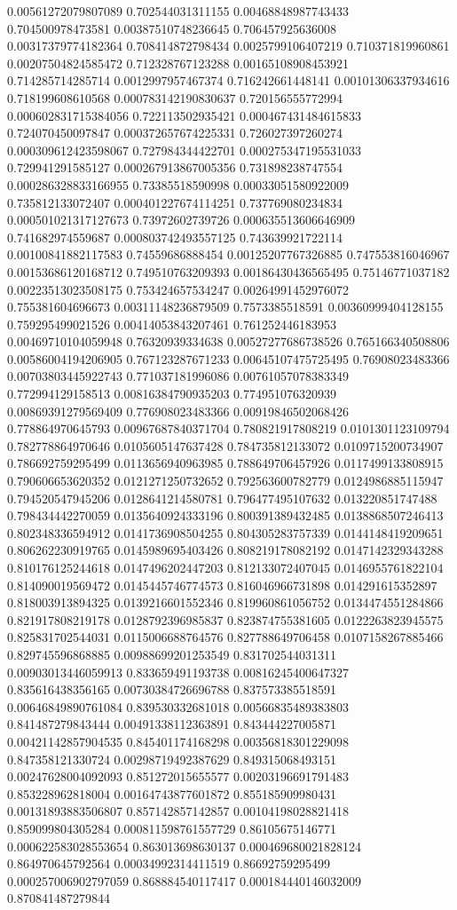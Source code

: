 \begin{table}
\begin{tabu}
\begin{sparkline}{10}
0.00561272079807089 0.702544031311155 0.00468848987743433 0.704500978473581 0.00387510748236645 0.706457925636008 0.00317379774182364 0.708414872798434 0.0025799106407219 0.710371819960861 0.00207504824585472 0.712328767123288 0.00165108908453921 0.714285714285714 0.0012997957467374 0.716242661448141 0.00101306337934616 0.718199608610568 0.000783142190830637 0.720156555772994 0.000602831715384056 0.722113502935421 0.000467431484615833 0.724070450097847 0.000372657674225331 0.726027397260274 0.000309612423598067 0.727984344422701 0.000275347195531033 0.729941291585127 0.000267913867005356 0.731898238747554 0.000286328833166955 0.73385518590998 0.00033051580922009 0.735812133072407 0.000401227674114251 0.737769080234834 0.000501021317127673 0.73972602739726 0.000635513606646909 0.741682974559687 0.000803742493557125 0.743639921722114 0.00100841882117583 0.74559686888454 0.00125207767326885 0.747553816046967 0.00153686120168712 0.749510763209393 0.00186430436565495 0.75146771037182 0.00223513023508175 0.753424657534247 0.00264991452976072 0.755381604696673 0.00311148236879509 0.7573385518591 0.00360999404128155 0.759295499021526 0.00414053843207461 0.761252446183953 0.00469710104059948 0.76320939334638 0.00527277686738526 0.765166340508806 0.00586004194206905 0.767123287671233 0.00645107475725495 0.76908023483366 0.00703803445922743 0.771037181996086 0.00761057078383349 0.772994129158513 0.00816384790935203 0.774951076320939 0.00869391279569409 0.776908023483366 0.00919846502068426 0.778864970645793 0.00967687840371704 0.780821917808219 0.0101301123109794 0.782778864970646 0.0105605147637428 0.784735812133072 0.0109715200734907 0.786692759295499 0.0113656940963985 0.788649706457926 0.0117499133808915 0.790606653620352 0.0121271250732652 0.792563600782779 0.0124986885115947 0.794520547945206 0.0128641214580781 0.796477495107632 0.013220851747488 0.798434442270059 0.0135640924333196 0.800391389432485 0.0138868507246413 0.802348336594912 0.0141736908504255 0.804305283757339 0.0144148419209651 0.806262230919765 0.0145989695403426 0.808219178082192 0.0147142329343288 0.810176125244618 0.0147496202447203 0.812133072407045 0.0146955761822104 0.814090019569472 0.0145445746774573 0.816046966731898 0.014291615352897 0.818003913894325 0.0139216601552346 0.819960861056752 0.0134474551284866 0.821917808219178 0.0128792396985837 0.823874755381605 0.0122263823945575 0.825831702544031 0.0115006688764576 0.827788649706458 0.0107158267885466 0.829745596868885 0.00988699201253549 0.831702544031311 0.00903013446059913 0.833659491193738 0.00816245400647327 0.835616438356165 0.00730384726696788 0.837573385518591 0.00646849890761084 0.839530332681018 0.00566835489383803 0.841487279843444 0.00491338112363891 0.843444227005871 0.00421142857904535 0.845401174168298 0.00356818301229098 0.847358121330724 0.00298719492387629 0.849315068493151 0.00247628004092093 0.851272015655577 0.00203196691791483 0.853228962818004 0.00164743877601872 0.855185909980431 0.00131893883506807 0.857142857142857 0.00104198028821418 0.859099804305284 0.000811598761557729 0.86105675146771 0.000622583028553654 0.863013698630137 0.000469680021828124 0.864970645792564 0.00034992314411519 0.86692759295499 0.000257006902797059 0.868884540117417 0.000184440146032009 0.870841487279844 
\end{sparkline}
\end{tabu}
\end{table}

